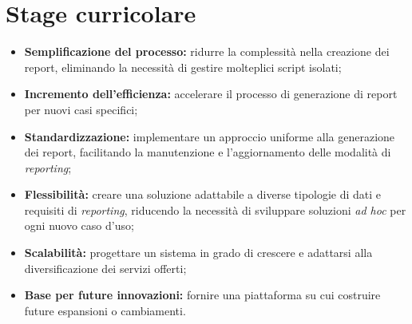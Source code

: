 
\chapter{Stage curricolare}
\label{chap:stage}

\begin{itemize}
	\item \textbf{Semplificazione del processo:} ridurre la complessità nella creazione dei report, eliminando la necessità di gestire molteplici script isolati;
	\item \textbf{Incremento dell'efficienza:} accelerare il processo di generazione di report per nuovi casi specifici;
	\item \textbf{Standardizzazione:} implementare un approccio uniforme alla generazione dei report, facilitando la manutenzione e l'aggiornamento delle modalità di \textit{reporting};
	\item \textbf{Flessibilità:} creare una soluzione adattabile a diverse tipologie di dati e requisiti di \textit{reporting}, riducendo la necessità di sviluppare soluzioni \textit{ad hoc} per ogni nuovo caso d'uso;
	\item \textbf{Scalabilità:} progettare un sistema in grado di crescere e adattarsi alla diversificazione dei servizi offerti;
	\item \textbf{Base per future innovazioni:} fornire una piattaforma su cui costruire future espansioni o cambiamenti.
\end{itemize}

